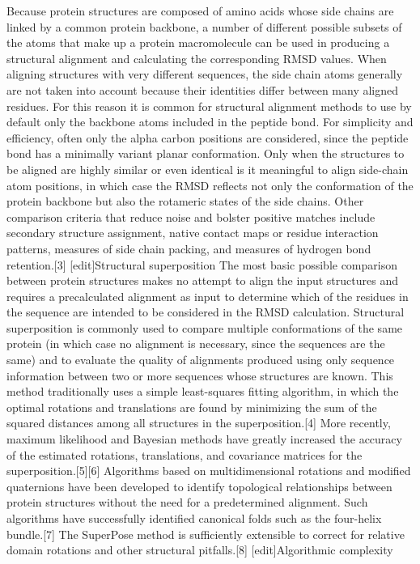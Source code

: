 \documentclass[a4paper, 12pt, titlepage, utf8]{extarticle}
\begin{document}
Because protein structures are composed of amino acids whose side chains are linked by a common protein backbone, a number of different possible subsets of the atoms that make up a protein macromolecule can be used in producing a structural alignment and calculating the corresponding RMSD values. When aligning structures with very different sequences, the side chain atoms generally are not taken into account because their identities differ between many aligned residues. For this reason it is common for structural alignment methods to use by default only the backbone atoms included in the peptide bond. For simplicity and efficiency, often only the alpha carbon positions are considered, since the peptide bond has a minimally variant planar conformation. Only when the structures to be aligned are highly similar or even identical is it meaningful to align side-chain atom positions, in which case the RMSD reflects not only the conformation of the protein backbone but also the rotameric states of the side chains. Other comparison criteria that reduce noise and bolster positive matches include secondary structure assignment, native contact maps or residue interaction patterns, measures of side chain packing, and measures of hydrogen bond retention.[3]
[edit]Structural superposition
The most basic possible comparison between protein structures makes no attempt to align the input structures and requires a precalculated alignment as input to determine which of the residues in the sequence are intended to be considered in the RMSD calculation. Structural superposition is commonly used to compare multiple conformations of the same protein (in which case no alignment is necessary, since the sequences are the same) and to evaluate the quality of alignments produced using only sequence information between two or more sequences whose structures are known. This method traditionally uses a simple least-squares fitting algorithm, in which the optimal rotations and translations are found by minimizing the sum of the squared distances among all structures in the superposition.[4] More recently, maximum likelihood and Bayesian methods have greatly increased the accuracy of the estimated rotations, translations, and covariance matrices for the superposition.[5][6]
Algorithms based on multidimensional rotations and modified quaternions have been developed to identify topological relationships between protein structures without the need for a predetermined alignment. Such algorithms have successfully identified canonical folds such as the four-helix bundle.[7] The SuperPose method is sufficiently extensible to correct for relative domain rotations and other structural pitfalls.[8]
[edit]Algorithmic complexity
\end{document}
